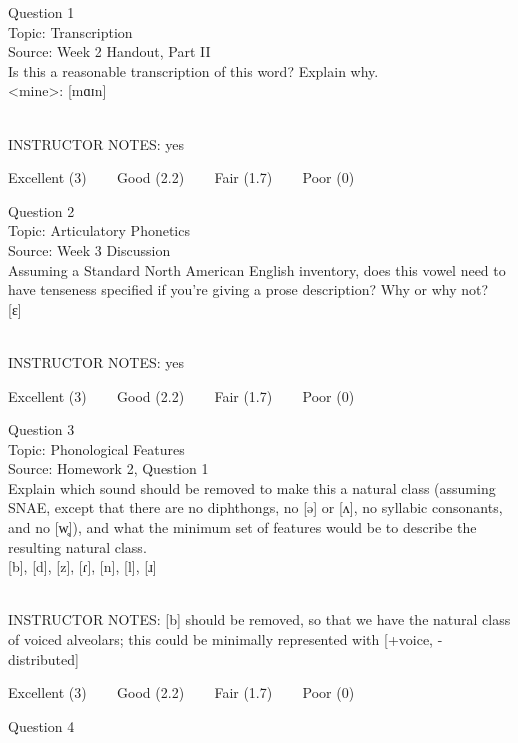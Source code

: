 \documentclass[12pt]{article}
\begin{document}
{\large Question 1}\\

Topic: Transcription\\
Source: Week 2 Handout, Part II\\

Is this a reasonable transcription of this word? Explain why.\\

<mine>: {[mɑɪn]}


~\\
INSTRUCTOR NOTES: yes


\vfill
Excellent (3) ~~~ Good (2.2) ~~~ Fair (1.7) ~~~ Poor (0)
\newpage

{\large Question 2}\\

Topic: Articulatory Phonetics\\
Source: Week 3 Discussion\\

Assuming a Standard North American English inventory, does this vowel need to have tenseness specified if you're giving a prose description? Why or why not?\\

{[ɛ]}


~\\
INSTRUCTOR NOTES: yes


\vfill
Excellent (3) ~~~ Good (2.2) ~~~ Fair (1.7) ~~~ Poor (0)
\newpage

{\large Question 3}\\

Topic: Phonological Features\\
Source: Homework 2, Question 1\\

Explain which sound should be removed to make this a natural class (assuming SNAE, except that there are no diphthongs, no [ə] or [ʌ], no syllabic consonants, and no [w̥]), and what the minimum set of features would be to describe the resulting natural class.\\

{[b]}, {[d]}, {[z]}, {[ɾ]}, {[n]}, {[l]}, {[ɹ]}


~\\
INSTRUCTOR NOTES: [b] should be removed, so that we have the natural class of voiced alveolars; this could be minimally represented with [+voice, -distributed]


\vfill
Excellent (3) ~~~ Good (2.2) ~~~ Fair (1.7) ~~~ Poor (0)
\newpage

{\large Question 4}\\
\end{document}
